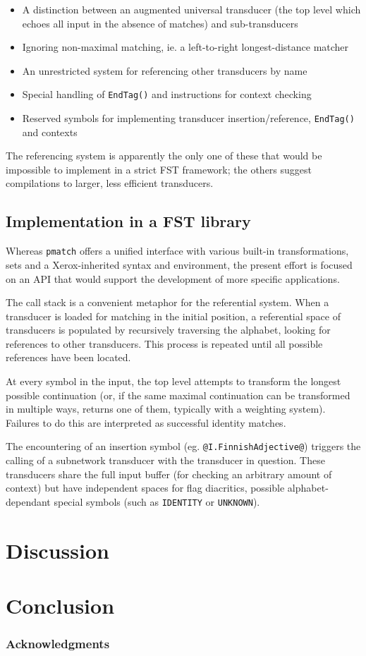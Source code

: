 \documentclass{llncs}
\begin{document}
\begin{itemize}
\item A distinction between an augmented universal transducer (the top level
which echoes all input in the absence of matches) and sub-transducers
\item Ignoring non-maximal matching, ie. a left-to-right longest-distance
matcher
\item An unrestricted system for referencing other transducers by name
\item Special handling of \verb!EndTag()! and instructions for context
checking
\item Reserved symbols for implementing transducer insertion/reference,
\verb!EndTag()! and contexts
\end{itemize}

The referencing system is apparently the only one of these that would be
impossible to implement in a strict FST framework; the others suggest
compilations to larger, less efficient transducers.

\subsection{Implementation in a FST library}

Whereas \verb!pmatch! offers a unified interface with various built-in
transformations, sets and a Xerox-inherited syntax and environment,
the present effort is focused on an API that would support the development
of more specific applications.

The call stack is a convenient metaphor for the referential system. When a
transducer is loaded for matching in the initial position, a referential space
of transducers is populated by recursively traversing the alphabet, looking
for references to other transducers. This process is repeated until all
possible references have been located.

At every symbol in the input, the top level attempts to transform the longest
possible continuation (or, if the same maximal continuation can be transformed
in multiple ways, returns one of them, typically with a weighting system).
Failures to do this are interpreted as successful identity matches.

The encountering of an insertion symbol (eg. \verb!@I.FinnishAdjective@!)
triggers the calling of a subnetwork transducer with the transducer in
question. These transducers share the full input buffer (for checking
an arbitrary amount of context) but have independent spaces for flag
diacritics, possible alphabet-dependant special symbols (such as \verb!IDENTITY!
or \verb!UNKNOWN!).

\section{Discussion}

\section{Conclusion}

\subsubsection*{Acknowledgments}




\end{document}
